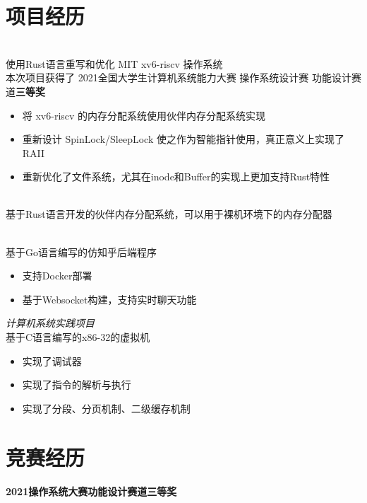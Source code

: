 \documentclass{cv}
\begin{document}

\section{项目经历}

\\
使用Rust语言重写和优化 MIT xv6-riscv 操作系统
\\
本次项目获得了 2021全国大学生计算机系统能力大赛 操作系统设计赛 功能设计赛道\textbf{三等奖}
\begin{itemize}
  \item 将 xv6-riscv 的内存分配系统使用伙伴内存分配系统实现
  \item 重新设计 SpinLock/SleepLock 使之作为智能指针使用，真正意义上实现了 RAII
  \item 重新优化了文件系统，尤其在inode和Buffer的实现上更加支持Rust特性
\end{itemize}


\\
基于Rust语言开发的伙伴内存分配系统，可以用于裸机环境下的内存分配器

\\
基于Go语言编写的仿知乎后端程序
\begin{itemize}
  \item 支持Docker部署
  \item 基于Websocket构建，支持实时聊天功能
\end{itemize}

{\it 计算机系统实践项目}
\vspace{0.4ex}
\\ 基于C语言编写的x86-32的虚拟机
\begin{itemize}
  \item 实现了调试器
  \item 实现了指令的解析与执行
  \item 实现了分段、分页机制、二级缓存机制
\end{itemize}

\section{竞赛经历}
\textbf{2021操作系统大赛功能设计赛道}\quad \textbf{三等奖}
\end{document}
